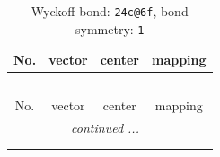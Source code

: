 \documentclass[fleqn,8pt]{jsarticle}
\begin{document}
\renewcommand{\arraystretch}{1.2}
\begin{longtable}{cccc}
\caption{Wyckoff bond: {\tt 24c@6f}, bond symmetry: {\tt 1}}
 \\
 \hline \hline
No. & vector & center & mapping \\ \hline \endfirsthead

\multicolumn{3}{l}{\tablename\ \thetable{}} \\
 \hline \hline
No. & vector & center & mapping \\ \hline \endhead

 \hline \hline
\multicolumn{3}{r}{\footnotesize\it continued ...} \\ \endfoot

 \hline \hline
\multicolumn{3}{r}{} \\ \endlastfoot


\end{longtable}
\end{document}
